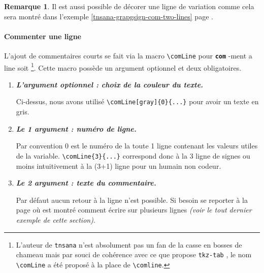 \documentclass[12pt,a4paper]{article}
\makeatletter
\newcommand\env[1]{\texttt{#1}}
\newcommand\macro[1]{\env{\textbackslash{}#1}}
\theoremstyle{definition}
\newtheorem*{remark}{Remarque}
\newcommand\whyprefix[2]{%
	\textbf{\prefix{#1}}-#2%
}
\newcommand\prefix[1]{%
	\texttt{#1}%
}
\newcommand\inenglish{\@ifstar{\@inenglish@star}{\@inenglish@no@star}}
\newcommand\@inenglish@star[1]{%
	\emph{\og #1 \fg}%
}
\newcommand\@inenglish@no@star[1]{%
	\@inenglish@star{#1} en anglais%
}
\makeatother
\begin{document}
\begin{remark}
	Il est aussi possible de décorer une ligne de variation comme cela sera montré dans l'exemple \ref{tnsana-grapgsign-com-two-lines} page \pageref{tnsana-grapgsign-com-two-lines}. 
\end{remark}




\paragraph{Commenter une ligne}

L'ajout de commentaires courts se fait via la macro \macro{comLine} pour \whyprefix{com}{ment a line} soit \inenglish{commenter une ligne}
\footnote{
    L'auteur de \prefix{tnsana} n'est absolument pas un fan de la casse en bosses de chameau mais par souci de cohérence avec ce que propose \prefix{tkz-tab}, le nom \macro{comLine} a été proposé à la place de \macro{comline}.
}.
Cette macro possède un argument optionnel et deux obligatoires.

\begin{enumerate}
    \item \textbf{\emph{L'argument optionnel : choix de la couleur du texte.}}
          
          \smallskip
          
          Ci-dessus, nous avons utilisé \verb#\comLine[gray]{0}{...}# pour avoir un texte en gris.


    \medskip
    \item \textbf{\emph{Le 1\ier{} argument : numéro de ligne.}}
          
          \smallskip
          
          Par convention $0$ est le numéro de la toute 1\iere{} ligne contenant les valeurs utiles de la variable.
          \verb#\comLine{3}{...}# correspond donc à la 3\ieme{} ligne de signes ou moins intuitivement à la (3+1)\ieme{} ligne pour un humain non codeur.

    \medskip
    \item \textbf{\emph{Le 2\ieme{} argument : texte du commentaire.}}
          
          \smallskip
          
          Par défaut aucun retour à la ligne n'est possible.
          Si besoin se reporter à la  page \pageref{tnsana-grapgsign-com-two-lines} où est montré comment écrire sur plusieurs lignes \emph{(voir le tout dernier exemple de cette section)}.
\end{enumerate}
\end{document}
